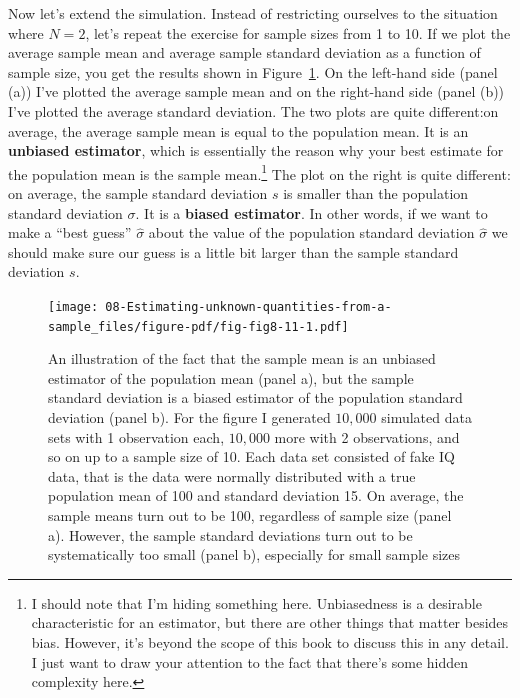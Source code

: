 \documentclass[
  a4paper,
]{book}
\begin{document}
Now let's extend the simulation. Instead of restricting ourselves to the
situation where \(N=2\), let's repeat the exercise for sample sizes from
1 to 10. If we plot the average sample mean and average sample standard
deviation as a function of sample size, you get the results shown in
Figure~\ref{fig-fig8-11}. On the left-hand side (panel (a)) I've plotted
the average sample mean and on the right-hand side (panel (b)) I've
plotted the average standard deviation. The two plots are quite
different:on average, the average sample mean is equal to the population
mean. It is an \textbf{unbiased estimator}, which is essentially the
reason why your best estimate for the population mean is the sample
mean.\footnote{I should note that I'm hiding something here.
  Unbiasedness is a desirable characteristic for an estimator, but there
  are other things that matter besides bias. However, it's beyond the
  scope of this book to discuss this in any detail. I just want to draw
  your attention to the fact that there's some hidden complexity here.}
The plot on the right is quite different: on average, the sample
standard deviation \(s\) is smaller than the population standard
deviation \(\sigma\). It is a \textbf{biased estimator}. In other words,
if we want to make a ``best guess'' \(\hat{\sigma}\) about the value of
the population standard deviation \(\hat{\sigma}\) we should make sure
our guess is a little bit larger than the sample standard deviation
\(s\).

\begin{figure}

\texttt{[image: 08-Estimating-unknown-quantities-from-a-sample\_files/figure-pdf/fig-fig8-11-1.pdf]} \hfill{}

\caption{\label{fig-fig8-11}An illustration of the fact that the sample
mean is an unbiased estimator of the population mean (panel a), but the
sample standard deviation is a biased estimator of the population
standard deviation (panel b). For the figure I generated \(10,000\)
simulated data sets with 1 observation each, \(10,000\) more with 2
observations, and so on up to a sample size of 10. Each data set
consisted of fake IQ data, that is the data were normally distributed
with a true population mean of 100 and standard deviation 15. On
average, the sample means turn out to be 100, regardless of sample size
(panel a). However, the sample standard deviations turn out to be
systematically too small (panel b), especially for small sample sizes}

\end{figure}
\end{document}
